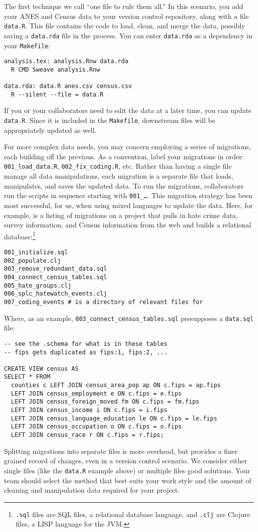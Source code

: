 \documentclass[]{article}
\begin{document}
The first technique we call ``one file to rule them all.'' In this scenario,
you add your ANES and Census data to your version control repository, along
with a file \texttt{data.R}. This file contains the code to load, clean, and
merge the data, possibly saving a \texttt{data.rda} file in the process. You can
enter \texttt{data.rda} as a dependency in your \texttt{Makefile}:

\begin{verbatim}
analysis.tex: analysis.Rnw data.rda
  R CMD Sweave analysis.Rnw

data.rda: data.R anes.csv census.csv
  R --silent --file = data.R
\end{verbatim}

If you or your collaborators need to edit the data at a later time, you can
update \texttt{data.R}. Since it is included in the \texttt{Makefile},
downstream files will be appropriately updated as well.

For more complex data needs, you may concern employing a series of migrations,
each building off the previous. As a convention, label your migrations in
order: \texttt{001\_load\_data.R}, \texttt{002\_fix\_coding.R}, etc. Rather than
having a single file manage all data manipulations, each migration is a
separate file that loads, manipulates, and saves the updated data. To run the
migrations, collaborators run the scripts in sequence starting with
\texttt{001\_\ldots}. This migration strategy has been most successful, for us,
when using mixed languages to update the data. Here, for example, is a listing
of migrations on a project that pulls in hate crime data, survey information,
and Census information from the web and builds a relational
database:\footnote{\texttt{.sql} files are SQL files, a relational database
language, and \texttt{.clj} are Clojure files, a LISP language for the JVM.}
\begin{verbatim}
001_initialize.sql
002_populate.clj
003_remove_redundant_data.sql
004_connect_census_tables.sql
005_hate_groups.clj
006_splc_hatewatch_events.clj
007_coding_events # is a directory of relevant files for 
\end{verbatim}
Where, as an example, \texttt{003\_connect\_census\_tables.sql} presupposes a
\texttt{data.sql} file:
\begin{verbatim}
-- see the .schema for what is in these tables
-- fips gets duplicated as fips:1, fips:2, ...

CREATE VIEW census AS
SELECT * FROM 
  counties c LEFT JOIN census_area_pop ap ON c.fips = ap.fips
  LEFT JOIN census_employment e ON c.fips = e.fips
  LEFT JOIN census_foreign_moved fm ON c.fips = fm.fips
  LEFT JOIN census_income i ON c.fips = i.fips
  LEFT JOIN census_language_education le ON c.fips = le.fips
  LEFT JOIN census_occupation o ON c.fips = o.fips
  LEFT JOIN census_race r ON c.fips = r.fips;
\end{verbatim}
Splitting migrations into separate files is more overhead, but provides a
finer grained record of changes, even in a version control scenario. We
consider either single files (like the \texttt{data.R} example above) or
multiple files good solutions. Your team should select the method that best
suits your work style and the amount of cleaning and manipulation data
required for your project.
\end{document}
